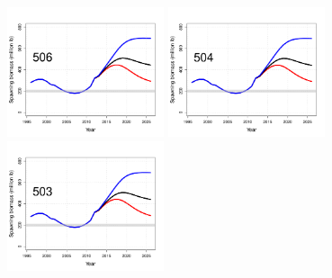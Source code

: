 \begin{figure}[htbp]
	\centering
		\includegraphics[height=1.5in]{../FIGURES/fig_SQUO_DI_SBio.pdf}
		\includegraphics[height=1.5in]{../FIGURES/fig_BSAI_DI_SBio.pdf}
		\includegraphics[height=1.5in]{../FIGURES/fig_GULF_DI_SBio.pdf}
		

\end{figure}
